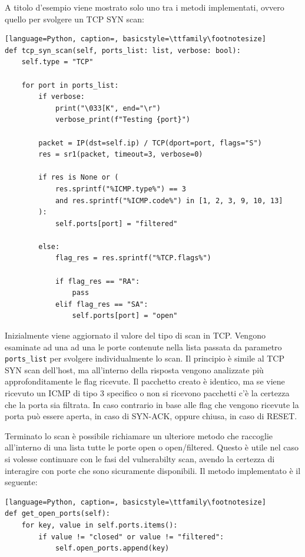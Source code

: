 \documentclass[12pt]{report}
\begin{document}
A titolo d'esempio viene mostrato solo uno tra i metodi implementati, ovvero quello per svolgere un TCP SYN scan:

\begin{lstlisting}[language=Python, caption=, basicstyle=\ttfamily\footnotesize]
def tcp_syn_scan(self, ports_list: list, verbose: bool):
    self.type = "TCP"

    for port in ports_list:
        if verbose:
            print("\033[K", end="\r")
            verbose_print(f"Testing {port}")

        packet = IP(dst=self.ip) / TCP(dport=port, flags="S")
        res = sr1(packet, timeout=3, verbose=0)

        if res is None or (
            res.sprintf("%ICMP.type%") == 3
            and res.sprintf("%ICMP.code%") in [1, 2, 3, 9, 10, 13]
        ):
            self.ports[port] = "filtered"

        else:
            flag_res = res.sprintf("%TCP.flags%")

            if flag_res == "RA":
                pass
            elif flag_res == "SA":
                self.ports[port] = "open"
\end{lstlisting}

Inizialmente viene aggiornato il valore del tipo di scan in TCP. Vengono esaminate ad una ad una le porte contenute nella lista passata da parametro \lstinline{ports_list} per svolgere individualmente lo scan. Il principio è simile al TCP SYN scan dell'host, ma all'interno della risposta vengono analizzate più approfonditamente le flag ricevute. Il pacchetto creato è identico, ma se viene ricevuto un ICMP di tipo 3 specifico o non si ricevono pacchetti c'è la certezza che la porta sia filtrata. In caso contrario in base alle flag che vengono ricevute la porta può essere aperta, in caso di SYN-ACK, oppure chiusa, in caso di RESET.

Terminato lo scan è possibile richiamare un ulteriore metodo che raccoglie all'interno di una lista tutte le porte open o open/filtered. Questo è utile nel caso si volesse continuare con le fasi del vulnerabilty scan, avendo la certezza di interagire con porte che sono sicuramente disponibili. Il metodo implementato è il seguente:

\begin{lstlisting}[language=Python, caption=, basicstyle=\ttfamily\footnotesize]
def get_open_ports(self):
    for key, value in self.ports.items():
        if value != "closed" or value != "filtered":
            self.open_ports.append(key)
\end{lstlisting}
\end{document}
